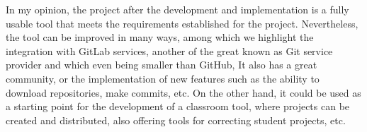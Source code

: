 In my opinion, the project after the development and implementation is
a fully usable tool that meets the requirements established for the
project. Nevertheless, the tool can be improved in many ways, among
which we highlight the integration with GitLab services, another of
the great known as Git service provider and which even being smaller
than GitHub, It also has a great community, or the implementation of
new features such as the ability to download repositories, make
commits, etc. On the other hand, it could be used as a starting point
for the development of a classroom tool, where projects can be created
and distributed, also offering tools for correcting student projects,
etc.















